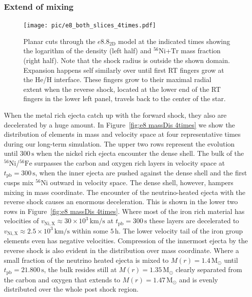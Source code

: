 \documentclass[fleqn,usenatbib]{mnras}
\newcommand{\nickel}{\ensuremath{\mathrm{^{56}Ni}}\xspace}
\newcommand{\tracer}{\ensuremath{\mathrm{Tr}}\xspace}
\newcommand{\iron}{\ensuremath{\mathrm{^{56}Fe}}\xspace}
\newcommand{\s}{\ensuremath{\text{s}}}
\begin{document}
\subsubsection{Extend of mixing}
\begin{figure}%
 \centering
 \texttt{[image: pic/e8\_both\_slices\_4times.pdf]} 
 \caption{Planar cuts through the $e8.8_{\mathrm{2D}}$ model at the indicated times showing the logarithm of the density (left half) and \nickel+\tracer mass fraction (right half). Note that the shock radius is outside the shown domain. Expansion happens self similarly over until first RT fingers grow at the He/H interface. These fingers grow to their maximal radial extent when the reverse shock, located at the lower end of the RT fingers in the lower left panel, travels back to the center of the star.}
 \label{fig:e8 3d 4times}
\end{figure}
When the metal rich ejecta catch up with the forward shock, they also are decelerated by a huge amount.
In Figure~\ref{fig:e8 massDis 4times} we show the distribution of elements in mass and velocity space at four representative times during our long-term simulation. The upper two rows represent the evolution until $300\,\text{s}$ when the nickel rich ejecta encounter the dense shell.
The bulk of the \nickel/\iron surpasses the carbon and oxygen rich layers in velocity space at $t_{\mathrm{pb}}=300\,\text{s}$, when the inner ejecta are pushed against the dense shell and the first cusps mix \nickel outward in velocity space. The dense shell, however, hampers mixing in mass coordinate.
The encounter of the neutrino-heated ejecta with the reverse shock causes an enormous deceleration. This is shown in the lower two rows in Figure~\ref{fig:e8 massDis 4times}. Where most of the iron rich material has velocities of $v_{\mathrm{Ni,X}}\approx 30\times10^3 \,\mathrm{km/s}$ at $t_{\mathrm{pb}}=300\,\text{s}$ these layers are decelerated to $v_{\mathrm{Ni,X}}\approx 2.5\times 10^3\,\mathrm{km/s}$ within some $5 \,\mathrm{h}$. The lower velocity tail of the iron group elements even has negative velocities. 
Compression of the innermost ejecta by the reverse shock is also evident in the distribution over mass coordinate. Where a small fraction of the neutrino heated ejecta is mixed to $M(r)=1.4\,\mathrm{M_{\odot}}$ until $t_{\mathrm{pb}}=21.800\,\s$, the bulk resides still at  $M(r)=1.35\,\mathrm{M_{\odot}}$ clearly separated from the carbon and oxygen that extends to $M(r)=1.47\,\mathrm{M_{\odot}}$ and is evenly distributed over the whole post shock region.
\end{document}
